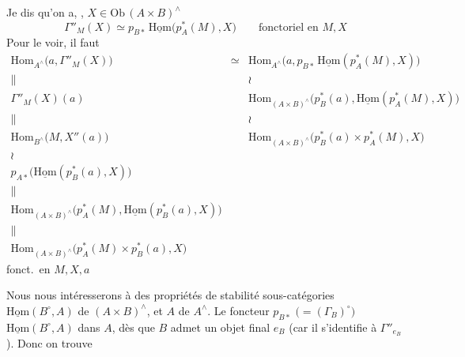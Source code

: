 \documentclass[11pt,a4paper]{article}
\begin{document}
Je dis qu'on a, , $X \in \mathrm{Ob}\,(A \times
B)^{\wedge}$ 
\[
\Gamma''_M(X) \simeq p_{B*}\, \underline{\mathrm{Hom}}\bigl(p_A^{*}(M),
X\bigr) \qquad \text{fonctoriel en } M, X
\]
Pour le voir,  il faut 
\[
\begin{array}{ccc}
\mathrm{Hom}_{A^{\wedge}}\bigl(a, \Gamma''_M(X)\bigr) & \simeq &
\mathrm{Hom}_{A^{\wedge}}\bigl(a, p_{B*}\, \underline{\mathrm{Hom}}(p_A^{*}(M), X)\bigr)\\
\| & & \wr\\
\Gamma''_M(X)(a) & &
\mathrm{Hom}_{(A \times B)^{\wedge}}\bigl(p_B^{*}(a), \underline{\mathrm{Hom}}(p_A^{*}(M), X)\bigr)\\
\| & & \wr\\
\mathrm{Hom}_{B^{\wedge}}\bigl(M, X''(a)\bigr) & &
\mathrm{Hom}_{(A \times B)^{\wedge}}\bigl(p_B^{*}(a) \times p_A^{*}(M), X\bigr)\\
\wr & &\\
p_{A*}\bigl(\underline{\mathrm{Hom}}(p_B^{*}(a), X)\bigr) & &\\
\| & &\\
\mathrm{Hom}_{(A \times B)^{\wedge}}\bigl(p_A^{*}(M), \underline{\mathrm{Hom}}(p_B^{*}(a), X)\bigr) & &\\
\| & &\\
\mathrm{Hom}_{(A \times B)^{\wedge}}\bigl(p_A^{*}(M) \times p_B^{*}(a), X\bigr) & &
\end{array}
\]
fonct.\ en $M, X, a$



Nous nous intéresserons  à des propriétés de
stabilité \struck{\ill{}}  sous-catégories
$\underline{\mathrm{Hom}}(B^{\circ}, A)$ de $(A \times B)^{\wedge}$, et $A$
de $A^{\wedge}$. Le foncteur $p_{B*}$ $\bigl(= (\Gamma_B)^{\circ}\bigr)$
\ill{}  $\underline{\mathrm{Hom}}(B^{\circ},
A)$ dans $A$, dès que $B$ admet un objet final $e_B$ (car il s'identifie
 à $\Gamma''_{e_B}$). Donc on trouve
\end{document}
